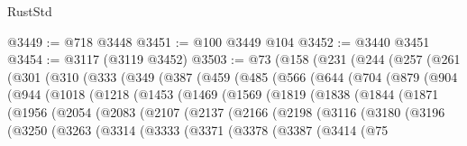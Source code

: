 \begin{lexlean}{RustStd}
\begin{coremodule}
@3449 := @718 @3448
@3451 := @100 @3449 @104
@3452 := @3440 @3451
@3454 := @3117 (@3119 @3452)
@3503 := @73
    (@158
      (@231
        (@244
          (@257
            (@261
              (@301
                (@310
                  (@333
                    (@349
                      (@387
                        (@459
                          (@485
                            (@566
                              (@644
                                (@704
                                  (@879
                                    (@904
                                      (@944
                                        (@1018
                                          (@1218
                                            (@1453
                                              (@1469
                                                (@1569
                                                  (@1819
                                                    (@1838
                                                      (@1844
                                                        (@1871
                                                          (@1956
                                                            (@2054
                                                              (@2083
                                                                (@2107
                                                                  (@2137
                                                                    (@2166
                                                                      (@2198
                                                                        (@3116
                                                                          (@3180
                                                                            (@3196
                                                                              (@3250
                                                                                (@3263
                                                                                  (@3314
                                                                                    (@3333
                                                                                      (@3371
                                                                                        (@3378
                                                                                          (@3387
                                                                                            (@3414
                                                                                              (@75

\end{coremodule}
\end{lexlean}
